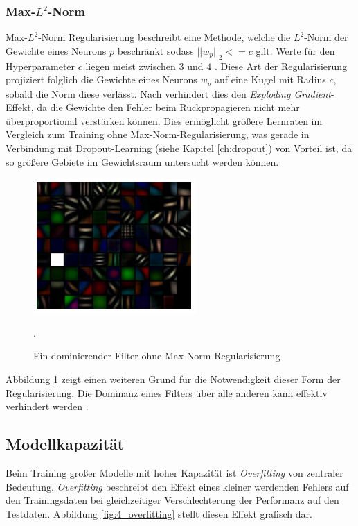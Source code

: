 \subsubsection{Max-$L^2$-Norm}

Max-$L^2$-Norm Regularisierung beschreibt eine Methode, welche die $L^2$-Norm der Gewichte eines Neurons $p$ beschränkt sodass $||w_p||_2 <= c$ gilt. Werte für den Hyperparameter $c$ liegen meist zwischen $3$ und $4$ \cite[vgl.][]{Srivastava2014}. Diese Art der Regularisierung projiziert folglich die Gewichte eines Neurons $w_p$ auf eine Kugel mit Radius $c$, sobald die Norm diese verlässt. 
Nach \cite{Srivastava2014} verhindert dies den \textit{Exploding Gradient}-Effekt, da die Gewichte den Fehler beim Rückpropagieren nicht mehr überproportional verstärken können. Dies ermöglicht größere Lernraten im Vergleich zum Training ohne Max-Norm-Re\-gu\-la\-ri\-sie\-rung, was gerade in Verbindung mit Dropout-Learning (siehe Kapitel \ref{ch:dropout}) von Vorteil ist, da so größere Gebiete im Gewichtsraum untersucht werden können.

\begin{figure}[H]
\centering
\includegraphics[width=0.4\linewidth]{images/4_max_norm}
\caption[]{Ein dominierender Filter ohne Max-Norm Regularisierung  \cite[siehe][]{Zeiler2014}}.
\label{fig:4_max_norm}
\end{figure}

 Abbildung \ref{fig:4_max_norm} zeigt einen weiteren Grund für die Notwendigkeit dieser Form der Regularisierung. Die Dominanz eines Filters über alle anderen kann effektiv verhindert werden \cite[vgl.][]{Zeiler2014}.




\subsection{Modellkapazität}
Beim Training großer Modelle mit hoher Kapazität ist \textit{Overfitting} von zentraler Bedeutung. \textit{Overfitting} beschreibt den Effekt eines kleiner werdenden Fehlers auf den Trainingsdaten bei gleichzeitiger Verschlechterung der Performanz auf den Testdaten. Abbildung \ref{fig:4_overfitting} stellt diesen Effekt grafisch dar.

